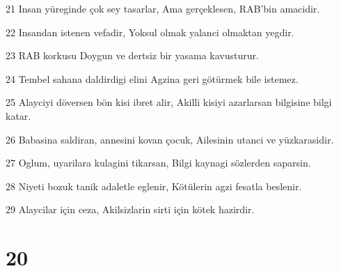 \par 21 Insan yüreginde çok sey tasarlar, Ama gerçeklesen, RAB'bin amacidir.
\par 22 Insandan istenen vefadir, Yoksul olmak yalanci olmaktan yegdir.
\par 23 RAB korkusu Doygun ve dertsiz bir yasama kavusturur.
\par 24 Tembel sahana daldirdigi elini Agzina geri götürmek bile istemez.
\par 25 Alayciyi döversen bön kisi ibret alir, Akilli kisiyi azarlarsan bilgisine bilgi katar.
\par 26 Babasina saldiran, annesini kovan çocuk, Ailesinin utanci ve yüzkarasidir.
\par 27 Oglum, uyarilara kulagini tikarsan, Bilgi kaynagi sözlerden saparsin.
\par 28 Niyeti bozuk tanik adaletle eglenir, Kötülerin agzi fesatla beslenir.
\par 29 Alaycilar için ceza, Akilsizlarin sirti için kötek hazirdir.

\chapter{20}


